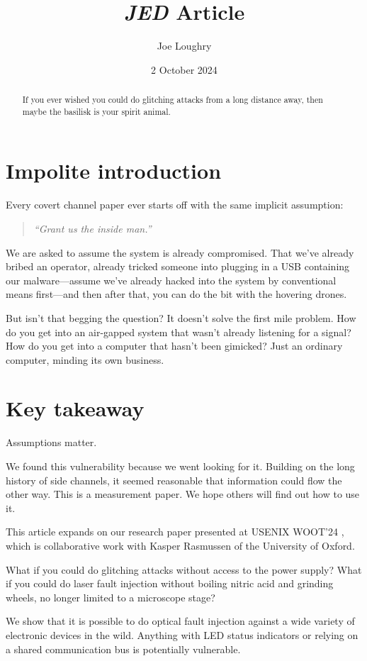 \documentclass[letterpaper]{article}
\date{2 October 2024}
\title{\emph{JED} Article}
\author{Joe Loughry}
\begin{document}
\maketitle
\begin{abstract}
If you ever wished you could do glitching attacks from a long distance away,
then maybe the basilisk is your spirit animal.
\end{abstract}
\section{Impolite introduction}
Every covert channel paper ever starts off with the same implicit assumption:
\begin{quote}
{\it ``Grant us the inside man.''}
\end{quote}

\noindent We are asked to assume the system is already compromised. That we've
already bribed an operator, already tricked someone into plugging in a USB
containing our malware---assume we've already hacked into the system by
conventional means first---and then after that, you can do the bit with the
hovering drones.

But isn't that begging the question? It doesn't solve the first mile problem.
How do you get into an air-gapped system that wasn't already listening for a
signal? How do you get into a computer that hasn't been gimicked? Just an
ordinary computer, minding its own business.

\section{Key takeaway}

Assumptions matter.

We found this vulnerability because we went looking for it. Building on the
long history of side channels, it seemed reasonable that information could flow
the other way. This is a measurement paper. We hope others will find out how to
use it.

This article expands on our research paper presented at USENIX WOOT'24
\cite{Loughry2024b}, which is collaborative work with Kasper Rasmussen of the
University of Oxford.

What if you could do glitching attacks without access to the power supply? What
if you could do laser fault injection without boiling nitric acid and grinding
wheels, no longer limited to a microscope stage?

We show that
it is possible to do optical fault injection against a wide variety of electronic
devices in the wild. Anything with LED status indicators or relying on a shared
communication bus is potentially vulnerable.
\end{document}
